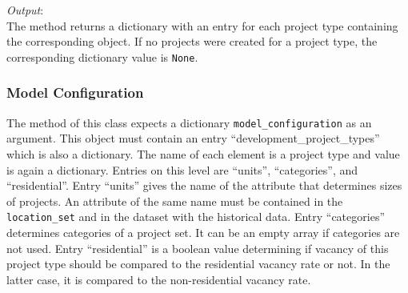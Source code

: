 {\it Output}:~\\[1mm]
The method returns a dictionary with an entry for each project type containing
the corresponding  object. If no projects were
created for a project type, the corresponding dictionary value is \verb|None|.


\subsubsection{Model Configuration}
\label{sec:DPTM-configuration}
\modelsindex
The  method of this class expects a dictionary
\verb|model_configuration| as an argument. This object must contain an entry
``development_project_types'' which is also a dictionary. The name of each
element is a project type and value is again a dictionary. Entries on this
level are ``units'', ``categories'', and ``residential''. Entry ``units''
gives the name of the attribute that determines sizes of projects. An
attribute of the same name must be contained in the \verb|location_set| and in
the dataset with the historical data. Entry ``categories'' determines
categories of a project set. It can be an empty array if categories are not
used. Entry ``residential'' is a boolean value determining if vacancy of this
project type should be compared to the residential vacancy rate or not. In the
latter case, it is compared to the non-residential vacancy rate.

